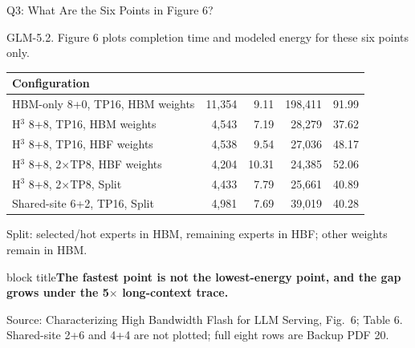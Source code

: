 \documentclass[aspectratio=169,10pt]{beamer}
\newcommand{\takeaway}[1]{\par\vspace{.12cm}\begin{beamercolorbox}[rounded=true,sep=.12cm,wd=\linewidth]{block title}\small\bfseries #1\end{beamercolorbox}}
\newcommand{\src}[1]{\par\vfill{\fontsize{7}{8}\selectfont\color{Muted}Source: Characterizing High Bandwidth Flash for LLM Serving, #1.}\par}
\renewcommand{\arraystretch}{1.15}
\begin{document}
\begin{frame}[t]{Q3: What Are the Six Points in Figure 6?}

\small GLM-5.2. Figure 6 plots completion time and modeled energy for these six points only.
\par\vspace{.12cm}
\setlength{\tabcolsep}{5pt}
\renewcommand{\arraystretch}{1.22}
\begin{tabularx}{\textwidth}{@{}>{\raggedright\arraybackslash}X r r r r@{}}\toprule
Configuration &
 &
 &
 &
\\\midrule
HBM-only 8+0, TP16, HBM weights & 11,354 & 9.11 & 198,411 & 91.99\\
H$^3$ 8+8, TP16, HBM weights & 4,543 & 7.19 & 28,279 & 37.62\\
H$^3$ 8+8, TP16, HBF weights & 4,538 & 9.54 & 27,036 & 48.17\\
H$^3$ 8+8, 2$\times$TP8, HBF weights & 4,204 & 10.31 & 24,385 & 52.06\\
H$^3$ 8+8, 2$\times$TP8, Split & 4,433 & 7.79 & 25,661 & 40.89\\
Shared-site 6+2, TP16, Split & 4,981 & 7.69 & 39,019 & 40.28\\\bottomrule
\end{tabularx}
\par\vspace{.1cm}
{\footnotesize Split: selected/hot experts in HBM, remaining experts in HBF; other weights remain in HBM.}
\takeaway{The fastest point is not the lowest-energy point, and the gap grows under the 5$\times$ long-context trace.}
\src{Fig.\ 6; Table 6. Shared-site 2+6 and 4+4 are not plotted; full eight rows are Backup PDF 20}
\end{frame}
\end{document}
